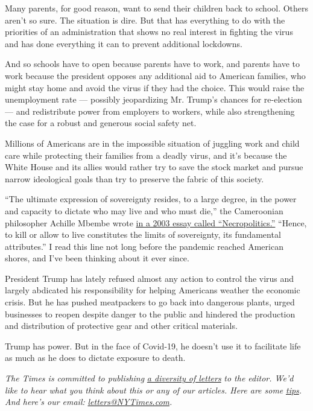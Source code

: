 Many parents, for good reason, want to send their children back to
school. Others aren't so sure. The situation is dire. But that has
everything to do with the priorities of an administration that shows no
real interest in fighting the virus and has done everything it can to
prevent additional lockdowns.

And so schools have to open because parents have to work, and parents
have to work because the president opposes any additional aid to
American families, who might stay home and avoid the virus if they had
the choice. This would raise the unemployment rate --- possibly
jeopardizing Mr. Trump's chances for re-election --- and redistribute
power from employers to workers, while also strengthening the case for a
robust and generous social safety net.

Millions of Americans are in the impossible situation of juggling work
and child care while protecting their families from a deadly virus, and
it's because the White House and its allies would rather try to save the
stock market and pursue narrow ideological goals than try to preserve
the fabric of this society.

``The ultimate expression of sovereignty resides, to a large degree, in
the power and capacity to dictate who may live and who must die,'' the
Cameroonian philosopher Achille Mbembe wrote
\href{https://warwick.ac.uk/fac/arts/english/currentstudents/postgraduate/masters/modules/postcol_theory/mbembe_22necropolitics22.pdf}{in
a 2003 essay called ``Necropolitics.''} ``Hence, to kill or allow to
live constitutes the limits of sovereignty, its fundamental
attributes.'' I read this line not long before the pandemic reached
American shores, and I've been thinking about it ever since.

President Trump has lately refused almost any action to control the
virus and largely abdicated his responsibility for helping Americans
weather the economic crisis. But he has pushed meatpackers to go back
into dangerous plants, urged businesses to reopen despite danger to the
public and hindered the production and distribution of protective gear
and other critical materials.

Trump has power. But in the face of Covid-19, he doesn't use it to
facilitate life as much as he does to dictate exposure to death.

\emph{The Times is committed to publishing}
\href{https://www.nytimes3xbfgragh.onion/2019/01/31/opinion/letters/letters-to-editor-new-york-times-women.html}{\emph{a
diversity of letters}} \emph{to the editor. We'd like to hear what you
think about this or any of our articles. Here are some}
\href{https://help.nytimes3xbfgragh.onion/hc/en-us/articles/115014925288-How-to-submit-a-letter-to-the-editor}{\emph{tips}}\emph{.
And here's our email:}
\href{mailto:letters@NYTimes.com}{\emph{letters@NYTimes.com}}\emph{.}

